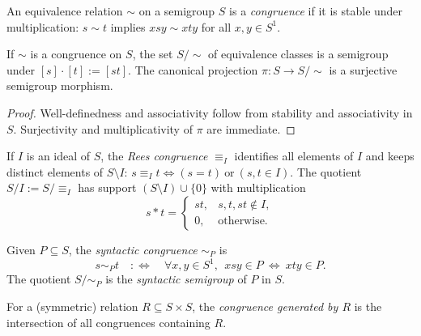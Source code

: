 
\begin{definition}
\label{def:congruence}
An equivalence relation \(\sim\) on a semigroup \(S\) is a \emph{congruence} if it is stable under multiplication: \(s\sim t\) implies \(x s y \sim x t y\) for all \(x,y\in S^1\).
\end{definition}

\begin{lemma}
\label{lem:quotient-by-congruence}
If \(\sim\) is a congruence on \(S\), the set \(S/{\sim}\) of equivalence classes is a semigroup under \([s]\cdot [t]:=[st]\). The canonical projection \(\pi:S\to S/{\sim}\) is a surjective semigroup morphism.
\end{lemma}
\begin{proof}
Well-definedness and associativity follow from stability and associativity in \(S\). Surjectivity and multiplicativity of \(\pi\) are immediate.
\end{proof}

\begin{definition}
\label{def:rees-congruence}
If \(I\) is an ideal of \(S\), the \emph{Rees congruence} \(\equiv_I\) identifies all elements of \(I\) and keeps distinct elements of \(S\setminus I\): \(s\equiv_I t\iff (s=t)\ \text{or}\ (s,t\in I)\). The quotient \(S/I:=S/{\equiv_I}\) has support \((S\setminus I)\cup\{0\}\) with multiplication
\[
s\ast t=\begin{cases}
st,& s,t,st\notin I,\\[2pt]
0,& \text{otherwise.}
\end{cases}
\]
\end{definition}

\begin{definition}
\label{def:syntactic-congruence}
Given \(P\subseteq S\), the \emph{syntactic congruence} \(\sim_P\) is
\[
s\sim_P t\quad:\Longleftrightarrow\quad \forall x,y\in S^1,\ \ x s y\in P\ \Leftrightarrow\ x t y\in P.
\]
The quotient \(S/{\sim_P}\) is the \emph{syntactic semigroup} of \(P\) in \(S\).
\end{definition}

\begin{definition}
\label{def:generated-congruence}
For a (symmetric) relation \(R\subseteq S\times S\), the \emph{congruence generated by \(R\)} is the intersection of all congruences containing \(R\).
\end{definition}

